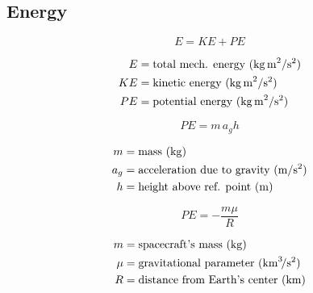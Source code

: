 \documentclass{article}
\begin{document}
\subsection{Energy}
\begin{multicols}{3}
	\begin{equation*}
	\boxed{E = KE + PE}
	\end{equation*}

	\begin{align*}
	E &= \text{total mech. energy (\si{\kilo\gram\,\meter\squared\per\second\squared)}}\\
	KE &= \text{kinetic energy (\si{\kilo\gram\,\meter\squared\per\second\squared)}}\\
	PE &= \text{potential energy (\si{\kilo\gram\,\meter\squared\per\second\squared)}}\\
	\end{align*}
	
	\vfill\null
	\columnbreak
	
	\begin{equation*}
	\boxed{PE = m\,a_{g}h}
	\end{equation*}
	
	\begin{align*}
	m &= \text{mass (\si{\kilo\gram})}\\
	a_{g} &= \text{acceleration due to gravity (\si{\meter\per\second\squared})}\\
	h &= \text{height above ref. point (\si{\meter})}\\
	\end{align*}
	\vfill\null
	\columnbreak
	
	\begin{equation*}
	\boxed{PE = -\dfrac{m\mu}{R}}
	\end{equation*}
	
	\begin{align*}
	m &= \text{spacecraft's mass (\si{\kilo\gram})}\\
	\mu &= \text{gravitational parameter (\si{\kilo\meter\cubed\per\second\squared})}\\
	R &= \text{distance from Earth's center (\si{\kilo\meter})}\\
	\end{align*}
	\vfill\null
\end{multicols}
\end{document}
